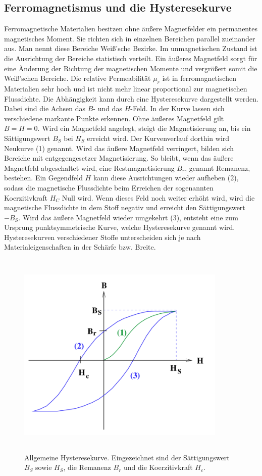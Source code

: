 \subsection{Ferromagnetismus und die Hysteresekurve}
Ferromagnetische Materialien besitzen ohne äußere Magnetfelder ein permanentes 
magnetisches Moment. Sie richten sich in einzelnen Bereichen parallel zueinander aus. 
Man nennt diese Bereiche Weiß'sche Bezirke. Im unmagnetischen Zustand ist die 
Ausrichtung der Bereiche statistisch verteilt. Ein äußeres Magnetfeld sorgt für eine 
Änderung der Richtung der magnetischen Momente und vergrößert somit die Weiß'schen 
Bereiche. 
\newline
Die relative Permeabilität $\mu_{r}$ ist in ferromagnetischen Materialien sehr hoch 
und ist nicht mehr linear proportional zur magnetischen Flussdichte. 
Die Abhängigkeit kann durch eine Hysteresekurve dargestellt werden.
Dabei sind die Achsen das $B$- und das $H$-Feld.
In der Kurve lassen sich verschiedene markante Punkte erkennen. 
Ohne äußeres Magnetfeld gilt $B = H = 0$. Wird ein Magnetfeld angelegt, steigt die 
Magnetisierung an, bis ein Sättigungswert $B_{S}$ bei $H_{S}$ erreicht wird. Der 
Kurvenverlauf dorthin wird Neukurve (1) genannt. 
Wird das äußere Magnetfeld verringert, bilden sich Bereiche mit entgegengesetzer 
Magnetisierung. So bleibt, wenn das äußere Magnetfeld abgeschaltet wird, eine 
Restmagnetisierung $B_{r}$, genannt Remanenz, bestehen. 
Ein Gegendfeld $H$ kann diese Ausrichtungen wieder 
aufheben (2), sodass die magnetische Flussdichte beim Erreichen der sogenannten Koerzitivkraft $H_C$ Null wird. Wenn dieses Feld noch weiter 
erhöht wird, wird die magnetische Flussdichte %
in dem Stoff negativ und erreicht den Sättigungswert $-B_{S}$. Wird das äußere 
Magnetfeld wieder umgekehrt (3), entsteht eine zum Ursprung punktsymmetrische Kurve, welche
Hysteresekurve genannt wird. Hysteresekurven verschiedener Stoffe unterscheiden sich je
nach Materialeigenschaften in der Schärfe bzw. Breite. 
\begin{figure}
    \centering
    \includegraphics[width=10cm,height=10cm]{build/Hysteresekurve.png}
    \caption{Allgemeine Hysteresekurve. Eingezeichnet sind der Sättigungswert $B_{S}$
    sowie $H_{S}$, die Remanenz $B_{r}$ und die Koerzitivkraft $H_{c}$.}
\end{figure}
